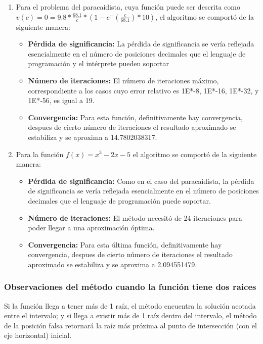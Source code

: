 \documentclass{article}
\begin{document}
\begin{enumerate}
\begin{itemize}
    \end{itemize}
    \item Para el problema del paracaidista, cuya función puede ser descrita como \(v(c) = 0 = 9.8* \frac{68.1}{c}*(1-e^-(\frac{c}{68.1})*10)\), el algoritmo se comportó de la siguiente manera:
    \begin{itemize}
        \item \textbf{Pérdida de significancia:}
        La pérdida de significancia se vería reflejada esencialmente en el número de posiciones decimales que el lenguaje de programación y el intérprete pueden soportar
        \item \textbf{Número de iteraciones:}
        El número de iteraciones máximo, correspondiente a los casos cuyo error relativo es 1E*-8, 1E*-16, 1E*-32, y 1E*-56, es igual a 19.
        \item \textbf{Convergencia:}
        Para esta función, definitivamente hay convergencia, despues de cierto número de iteraciones el resultado aproximado se estabiliza y se aproxima a 14.7802038317.
    \end{itemize}
    \item Para la función \(f(x) = x^3-2x-5 \) el algoritmo se comportó de la siguiente manera:
    \begin{itemize}
        \item \textbf{Pérdida de significancia:}
        Como en el caso del paracaidista, la pérdida de significancia se vería reflejada esencialmente en el número de posiciones decimales que el lenguaje de programación puede soportar.
        \item \textbf{Número de iteraciones:}
        El método necesitó de 24 iteraciones para poder llegar a una aproximación óptima.
        \item \textbf{Convergencia:}
        Para esta última función, definitivamente hay convergencia, despues de cierto número de iteraciones el resultado aproximado se estabiliza y se aproxima a 2.094551479.
    \end{itemize}
\end{enumerate}
\subsubsection{Observaciones del método cuando la función tiene dos raices}
Si la función llega a tener más de 1 raíz, el método encuentra la solución acotada entre el intervalo; y si llega a existir más de 1 raíz dentro del intervalo, el método de la posición falsa retornará la raíz más próxima al punto de intersección (con el eje horizontal) inicial.
\end{document}
